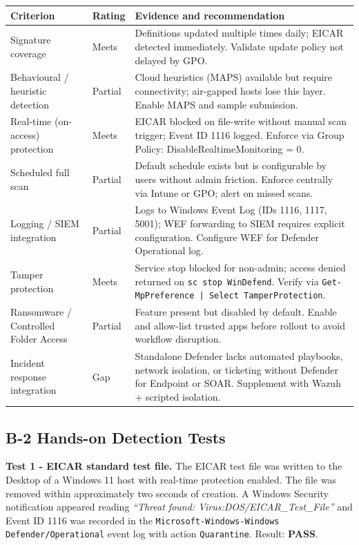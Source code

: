 \documentclass[10pt,a4paper]{article}
\begin{document}
\begin{longtable}{p{4.4cm}p{1.5cm}p{8.3cm}}
\toprule
Criterion & Rating & Evidence and recommendation \\
\midrule
Signature coverage & Meets & Definitions updated multiple times daily; EICAR detected immediately. Validate update policy not delayed by GPO. \\
Behavioural / heuristic detection & Partial & Cloud heuristics (MAPS) available but require connectivity; air-gapped hosts lose this layer. Enable MAPS and sample submission. \\
Real-time (on-access) protection & Meets & EICAR blocked on file-write without manual scan trigger; Event ID 1116 logged. Enforce via Group Policy: DisableRealtimeMonitoring = 0. \\
Scheduled full scan & Partial & Default schedule exists but is configurable by users without admin friction. Enforce centrally via Intune or GPO; alert on missed scans. \\
Logging / SIEM integration & Partial & Logs to Windows Event Log (IDs 1116, 1117, 5001); WEF forwarding to SIEM requires explicit configuration. Configure WEF for Defender Operational log. \\
Tamper protection & Meets & Service stop blocked for non-admin; access denied returned on \texttt{sc stop WinDefend}. Verify via \texttt{Get-MpPreference | Select TamperProtection}. \\
Ransomware / Controlled Folder Access & Partial & Feature present but disabled by default. Enable and allow-list trusted apps before rollout to avoid workflow disruption. \\
Incident response integration & Gap & Standalone Defender lacks automated playbooks, network isolation, or ticketing without Defender for Endpoint or SOAR. Supplement with Wazuh + scripted isolation. \\
\bottomrule
\end{longtable}

\subsection*{B-2 Hands-on Detection Tests}

\textbf{Test 1 - EICAR standard test file.} The EICAR test file was written to the Desktop of a Windows 11 host with real-time protection enabled. The file was removed within approximately two seconds of creation. A Windows Security notification appeared reading \textit{``Threat found: Virus:DOS/EICAR\_Test\_File''} and Event ID 1116 was recorded in the \texttt{Microsoft-Windows-Windows Defender/Operational} event log with action \texttt{Quarantine}. Result: \textbf{PASS}.
\end{document}
